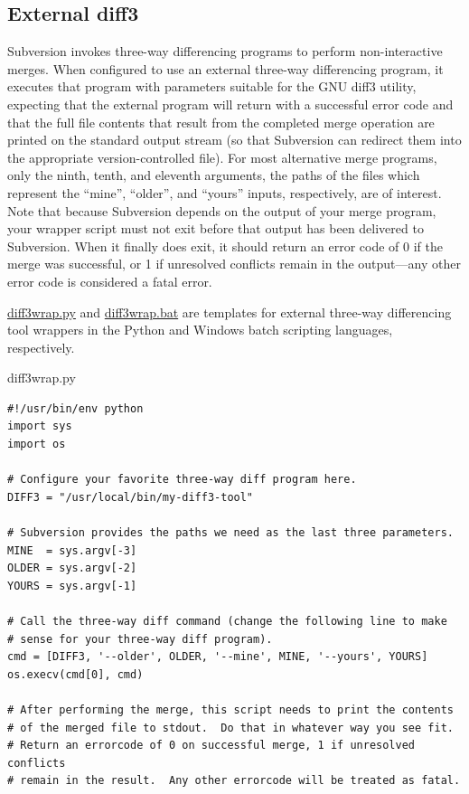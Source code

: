 \subsection{External diff3}\label{svn.advanced.externaldifftools.diff3}

Subversion invokes three-way differencing programs to perform
non-interactive merges. When configured to use an external three-way
differencing program, it executes that program with parameters suitable
for the GNU diff3 utility, expecting that the external program will
return with a successful error code and that the full file contents that
result from the completed merge operation are printed on the standard
output stream (so that Subversion can redirect them into the appropriate
version-controlled file). For most alternative merge programs, only the
ninth, tenth, and eleventh arguments, the paths of the files which
represent the ``mine'', ``older'', and ``yours'' inputs, respectively,
are of interest. Note that because Subversion depends on the output of
your merge program, your wrapper script must not exit before that output
has been delivered to Subversion. When it finally does exit, it should
return an error code of 0 if the merge was successful, or 1 if
unresolved conflicts remain in the output---any other error code is
considered a fatal error.

\hyperref[svn.advanced.externaldifftools.diff3.ex-1]{diff3wrap.py} and
\hyperref[svn.advanced.externaldifftools.diff3.ex-2]{diff3wrap.bat} are
templates for external three-way differencing tool wrappers in the
Python and Windows batch scripting languages, respectively.

\protect{}\label{svn.advanced.externaldifftools.diff3.ex-1}
diff3wrap.py

\begin{verbatim}
#!/usr/bin/env python
import sys
import os

# Configure your favorite three-way diff program here.
DIFF3 = "/usr/local/bin/my-diff3-tool"

# Subversion provides the paths we need as the last three parameters.
MINE  = sys.argv[-3]
OLDER = sys.argv[-2]
YOURS = sys.argv[-1]

# Call the three-way diff command (change the following line to make
# sense for your three-way diff program).
cmd = [DIFF3, '--older', OLDER, '--mine', MINE, '--yours', YOURS]
os.execv(cmd[0], cmd)

# After performing the merge, this script needs to print the contents
# of the merged file to stdout.  Do that in whatever way you see fit.
# Return an errorcode of 0 on successful merge, 1 if unresolved conflicts
# remain in the result.  Any other errorcode will be treated as fatal.
\end{verbatim}

